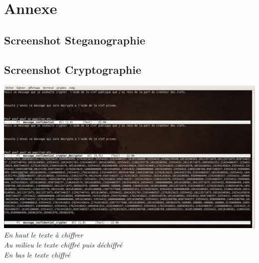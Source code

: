 \documentclass[a4paper,12pt]{article}
\begin{document}
\newpage

\section{Annexe}

\subsection {Screenshot Steganographie}

\newpage

\begin{landscape}
  \subsection {Screenshot Cryptographie}
  \begin{center}
    \includegraphics[scale=0.42]{cryptage.jpg}\\
    \textit{En haut le texte à chiffrer}\\
    \textit{Au milieu le texte chiffré puis déchiffré}\\
    \textit{En bas le texte chiffré}\\
  \end{center}
\end{landscape}

\newpage
\end{document}
